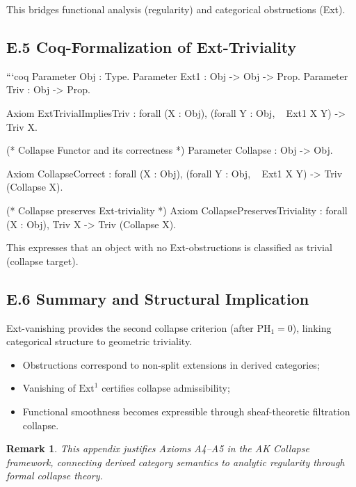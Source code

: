 \documentclass[11pt]{article}
\newtheorem{remark}[theorem]{Remark}
\begin{document}
This bridges functional analysis (regularity) and categorical obstructions (Ext).

\subsection*{E.5 Coq-Formalization of Ext-Triviality}

```coq
Parameter Obj : Type.
Parameter Ext1 : Obj -> Obj -> Prop.
Parameter Triv : Obj -> Prop.

Axiom ExtTrivialImpliesTriv :
  forall (X : Obj),
    (forall Y : Obj, ~ Ext1 X Y) -> Triv X.

(* Collapse Functor and its correctness *)
Parameter Collapse : Obj -> Obj.

Axiom CollapseCorrect :
  forall (X : Obj),
    (forall Y : Obj, ~ Ext1 X Y) -> Triv (Collapse X).

(* Collapse preserves Ext-triviality *)
Axiom CollapsePreservesTriviality :
  forall (X : Obj),
    Triv X -> Triv (Collapse X).

This expresses that an object with no Ext-obstructions is classified as trivial (collapse target).

\subsection*{E.6 Summary and Structural Implication}

Ext-vanishing provides the second collapse criterion (after \( \mathrm{PH}_1 = 0 \)),  
linking categorical structure to geometric triviality.

\begin{itemize}
  \item Obstructions correspond to non-split extensions in derived categories;
  \item Vanishing of \( \mathrm{Ext}^1 \) certifies collapse admissibility;
  \item Functional smoothness becomes expressible through sheaf-theoretic filtration collapse.
\end{itemize}

\begin{remark}
This appendix justifies Axioms A4–A5 in the AK Collapse framework,  
connecting derived category semantics to analytic regularity through formal collapse theory.
\end{remark}



\end{document}
